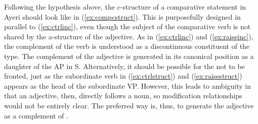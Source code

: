 \begin{figure}
\begin{morphlex}
\a{}
\xe
\end{morphlex}
\end{figure}

Following the hypothesis above, the c-structure of a comparative statement in
Ayeri should look like in (\ref{ex:compcstruct}). This is purposefully designed
in parallel to (\ref{ex:ctrlinc}), even though the subject of the comparative
verb is not shared by the a-structure of the adjective. As in
(\ref{ex:ctrlinc}) and (\ref{ex:raiseinc}), the complement of the verb is
understood as a discontinuous constituent of the \Plink{} type. The complement
of the adjective is generated in its canonical position as a daughter of the AP
in S. Alternatively, it should be possible for the  not to be fronted,
just as the subordinate verb in (\ref{ex:ctrlstruct}) and
(\ref{ex:raisestruct}) appears as the head of the subordinate VP. However, this
leads to ambiguity in that an adjective, then, directly follows a noun, so
modification relationships would not be entirely clear. The preferred way is,
thus, to generate the adjective as a complement of .

